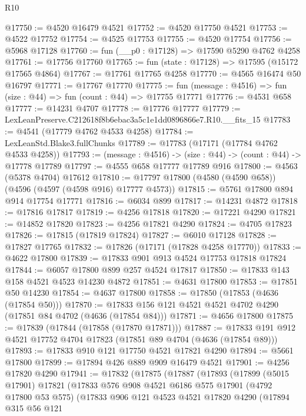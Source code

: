 \begin{lexlean}{R10}
\begin{coremodule}
@17750 := @4520 @16479 @4521
@17752 := @4520 @17750 @4521
@17753 := @4522 @17752
@17754 := @4525 @17753
@17755 := @4520 @17754
@17756 := @5968 @17128
@17760 := fun (__p0 : @17128) => @17590 @5290 @4762 @4258
@17761 := @17756 @17760
@17765 := fun (state : @17128) => @17595 (@15172 @17565 @4864)
@17767 := @17761 @17765 @4258
@17770 := @4565 @16474 @50 @16797
@17771 := @17767 @17770
@17775 := fun (message : @4516) => fun (size : @44) => fun (count : @44) => @17755 @17771
@17776 := @4531 @658
@17777 := @14231 @4707
@17778 := @17776 @17777
@17779 := LexLeanPreserve.C212618f8b6ebac3a5c1e1dd0896866e7.R10.__fits_15
@17783 := @4541 (@17779 @4762 @4533 @4258)
@17784 := LexLeanStd.Blake3.fullChunks
@17789 := @17783 (@17171 (@17784 @4762 @4533 @4258))
@17793 := (message : @4516) -> (size : @44) -> (count : @44) -> @17778 @17789
@17797 := @4555 @658 @17777 @17789 @916
@17800 := @4563 (@5378 @4704) @17612
@17810 := @17797 @17800 (@4580 (@4590 @658)) (@4596 (@4597 (@4598 @916) @17777 @4573))
@17815 := @5761 @17800 @894 @914 @17754 @17771
@17816 := @6034 @899
@17817 := @14231 @4872
@17818 := @17816 @17817
@17819 := @4256 @17818
@17820 := @17221 @4290
@17821 := @14852 @17820
@17823 := @4256 @17821 @4290
@17824 := @4705 @17823
@17826 := @17815 (@17819 @17824)
@17827 := @6010 @17128
@17828 := @17827 @17765
@17832 := @17826 (@17171 (@17828 @4258 @17770))
@17833 := @4622 @17800
@17839 := @17833 @901 @913 @4524 @17753 @17818 @17824
@17844 := @6057 @17800 @899 @257 @4524 @17817
@17850 := @17833 @143 @158 @4521 @4523 @14230 @4872
@17851 := @4631 @17800
@17853 := @17851 @50 @14230
@17854 := @4637 @17800
@17858 := @17850 (@17853 (@4636 (@17854 @50)))
@17870 := @17833 @156 @121 @4521 @4521 @4702 @4290 (@17851 @84 @4702 (@4636 (@17854 @84)))
@17871 := @4656 @17800
@17875 := @17839 (@17844 (@17858 (@17870 @17871)))
@17887 := @17833 @191 @912 @4521 @17752 @4704 @17823 (@17851 @89 @4704 (@4636 (@17854 @89)))
@17893 := @17833 @910 @121 @17750 @4521 @17821 @4290
@17894 := @5661 @17800
@17899 := @17894 @426 @889 @909 @16479 @4521
@17901 := @4256 @17820 @4290
@17941 := @17832
    (@17875
      (@17887
        (@17893
          (@17899
            (@5015 @17901)
            @17821
            (@17833
              @576
              @908
              @4521
              @6186
              @575
              @17901
              (@4792 @17800 @53 @575)
              (@17833
                @906
                @121
                @4523
                @4521
                @17820
                @4290
                (@17894
                  @315
                  @56
                  @121

\end{coremodule}
\end{lexlean}
